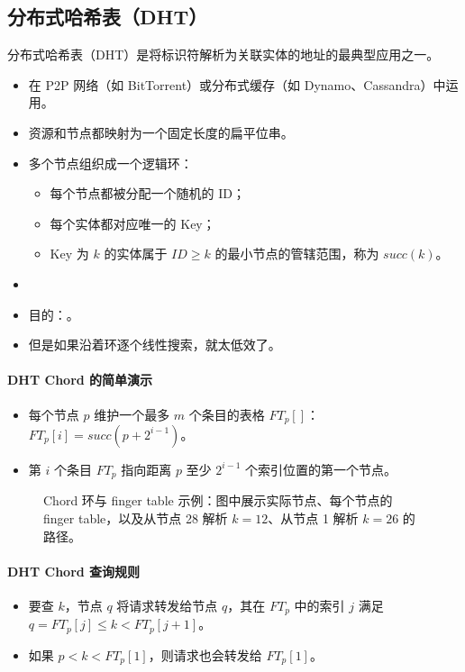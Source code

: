 \subsection{分布式哈希表（DHT）}

分布式哈希表（DHT）是将标识符解析为关联实体的地址的最典型应用之一。
\begin{itemize}
  \item 在 P2P 网络（如 BitTorrent）或分布式缓存（如 Dynamo、Cassandra）中运用。
  \item 资源和节点都映射为一个固定长度的扁平位串。
  \item 多个节点组织成一个逻辑环：
  \begin{itemize}
    \item 每个节点都被分配一个随机的 ID；
    \item 每个实体都对应唯一的 Key；
    \item Key 为 \(k\) 的实体属于 \(ID \ge k\) 的最小节点的管辖范围，称为 \(succ(k)\)。
  \end{itemize}
  \item {}
  \item 目的：。
  \item 但是如果沿着环逐个线性搜索，就太低效了。
\end{itemize}

\paragraph{DHT Chord 的简单演示}
\begin{itemize}
  \item 每个节点 \(p\) 维护一个最多 \(m\) 个条目的表格 \(FT_p[]\)：\(FT_p[i]=succ(p+2^{i-1})\)。
  \item 第 \(i\) 个条目 \(FT_p\) 指向距离 \(p\) 至少 \(2^{i-1}\) 个索引位置的第一个节点。
\end{itemize}

\begin{figure}[H]
  \centering
  \caption{Chord 环与 finger table 示例：图中展示实际节点、每个节点的 finger table，以及从节点 28 解析 \(k=12\)、从节点 1 解析 \(k=26\) 的路径。}
\end{figure}

\paragraph{DHT Chord 查询规则}
\begin{itemize}
  \item 要查 \(k\)，节点 \(q\) 将请求转发给节点 \(q\)，其在 \(FT_p\) 中的索引 \(j\) 满足 \(q=FT_p[j]\le k < FT_p[j+1]\)。
  \item 如果 \(p < k < FT_p[1]\)，则请求也会转发给 \(FT_p[1]\)。
\end{itemize}

